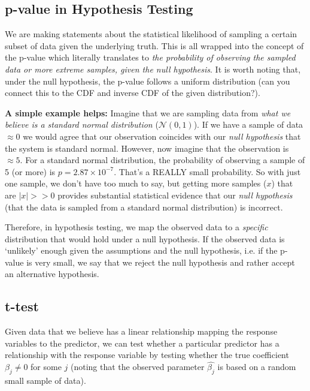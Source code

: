 \documentclass{article}
\begin{document}
\subsection{p-value in Hypothesis Testing}\label{p-value}
We are making statements about the statistical likelihood of sampling a certain subset of data given the underlying truth. This is all wrapped into the concept of the p-value which literally translates to \textit{the probability of observing the sampled data or more extreme samples, given the null hypothesis}. It is worth noting that, under the null hypothesis, the p-value follows a uniform distribution (can you connect this to the CDF and inverse CDF of the given distribution?).

\textbf{A simple example helps:}
Imagine that we are sampling data from \textit{what we believe is a standard normal distribution} ($\mathcal{N}(0,1)$). If we have a sample of data $\approx 0$ we would agree that our observation coincides with our \textit{null hypothesis} that the system is standard normal. However, now imagine that the observation is $\approx 5$. For a standard normal distribution, the probability of observing a sample of 5 (or more) is $p = 2.87 \times 10^{-7}$. That's a REALLY small probability. So with just one sample, we don't have too much to say, but getting more samples ($x$) that are $|x| >> 0$ provides substantial statistical evidence that our \textit{null hypothesis} (that the data is sampled from a standard normal distribution) is incorrect.

Therefore, in hypothesis testing, we map the observed data to a \textit{specific} distribution that would hold under a null hypothesis. If the observed data is `unlikely' enough given the assumptions and the null hypothesis, i.e. if the p-value is very small, we say that we reject the null hypothesis and rather accept an alternative hypothesis.


\subsection{t-test}\label{t-test}
Given data that we believe has a linear relationship mapping the response variables to the predictor, we can test whether a particular predictor has a relationship with the response variable by testing whether the true coefficient $\beta_j \neq 0$ for some $j$ (noting that the observed parameter $\hat{\beta_j}$ is based on a random small sample of data).
\end{document}
